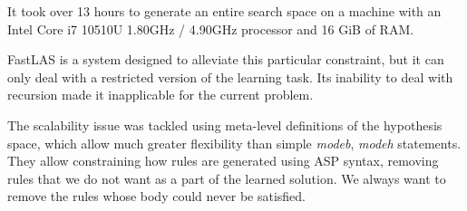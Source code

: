 
It took over 13 hours to generate an entire search space on a machine with an Intel Core i7 10510U 1.80GHz / 4.90GHz processor and 16 GiB of RAM.

FastLAS \cite{RefWorks:RefID:19-law2020fastlas:} is a system designed to alleviate this particular constraint, but it can only deal with a restricted version of the learning task.
Its inability to deal with recursion made it inapplicable for the current problem.

The scalability issue was tackled using meta-level definitions of the hypothesis space, which allow much greater flexibility than simple \textit{modeb}, \textit{modeh} statements. 
They allow constraining how rules are generated using ASP syntax, removing rules that we do not want as a part of the learned solution.
We always want to remove the rules whose body could never be satisfied.

